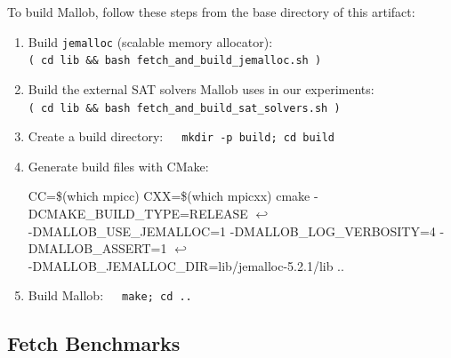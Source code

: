 \documentclass[runningheads]{article}
\newcommand{\CR}{{\tiny$\hookleftarrow$}}
\numberwithin{dummy}{subsection}
\begin{document}
To build Mallob, follow these steps from the base directory of this artifact:
\begin{enumerate}
 \item Build \texttt{jemalloc} (scalable memory allocator):\\
 \texttt{( cd lib \&\& bash fetch\_and\_build\_jemalloc.sh )}
 \item Build the external SAT solvers Mallob uses in our experiments:\\
 \texttt{( cd lib \&\& bash fetch\_and\_build\_sat\_solvers.sh )}
 \item Create a build directory:\ \ \ \texttt{mkdir -p build; cd build}
 \item Generate build files with CMake:
 \begin{ttfenv}
 CC=\$(which mpicc) CXX=\$(which mpicxx) cmake -DCMAKE\_BUILD\_TYPE=RELEASE \CR\\
 -DMALLOB\_USE\_JEMALLOC=1 -DMALLOB\_LOG\_VERBOSITY=4 -DMALLOB\_ASSERT=1 \CR\\
 -DMALLOB\_JEMALLOC\_DIR=lib/jemalloc-5.2.1/lib ..
 \end{ttfenv}
 \item Build Mallob:\ \ \ \texttt{make; cd ..}
\end{enumerate}

\subsection{Fetch Benchmarks}
\end{document}
